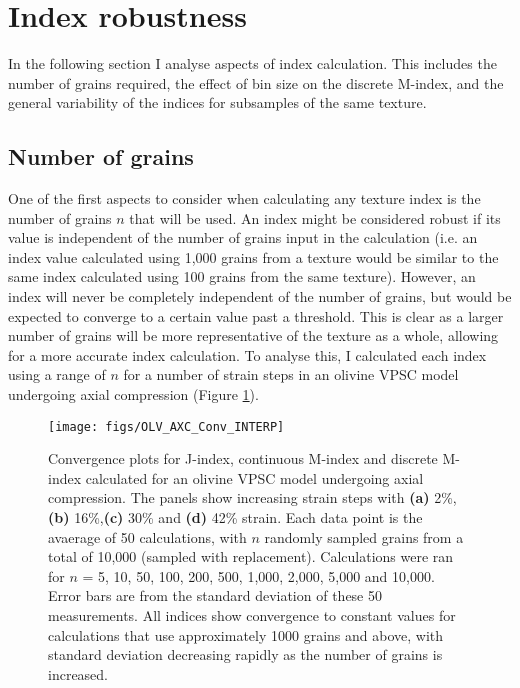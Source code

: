 \documentclass[a4paper,12pt,twoside]{report}
\numberwithin{equation}{chapter}
\begin{document}
\section{Index robustness}
In the following section I analyse aspects of index calculation. This includes the number of grains required, the effect of bin size on the discrete M-index, and the general variability of the indices for subsamples of the same texture. 

\subsection{Number of grains} \label{sec:no_grains_analysis}

One of the first aspects to consider when calculating any texture index is the number of grains $n$ that will be used. An index might be considered robust if its value is independent of the number of grains input in the calculation (i.e. an index value calculated using 1,000 grains from a texture would be similar to the same index calculated using 100 grains from the same texture). However, an index will never be completely independent of the number of grains, but would be expected to converge to a certain value past a threshold. This is clear as a larger number of grains will be more representative of the texture as a whole, allowing for a more accurate index calculation. To analyse this, I calculated each index using a range of $n$ for a number of strain steps in an olivine VPSC model undergoing axial compression (Figure \ref{fig:OLV_AXC_n_conv}). 

\begin{figure}[bht]
  \centering
    \texttt{[image: figs/OLV\_AXC\_Conv\_INTERP]}
  \caption[Convergence with no. grains (olivine VPSC)]{Convergence plots for J-index, continuous M-index and discrete M-index calculated for an olivine VPSC model undergoing axial compression. The panels show increasing strain steps with \textbf{(a)} 2\%, \textbf{(b)} 16\%,\textbf{(c)} 30\% and \textbf{(d)} 42\% strain. Each data point is the avaerage of 50 calculations, with $n$ randomly sampled grains from a total of 10,000 (sampled with replacement). Calculations were ran for $n$ = 5, 10, 50, 100, 200, 500, 1,000, 2,000, 5,000 and 10,000. Error bars are from the standard deviation of these 50 measurements. All indices show convergence to constant values for calculations that use approximately 1000 grains and above, with standard deviation decreasing rapidly as the number of grains is increased.}
  \label{fig:OLV_AXC_n_conv}
\end{figure}
\end{document}

